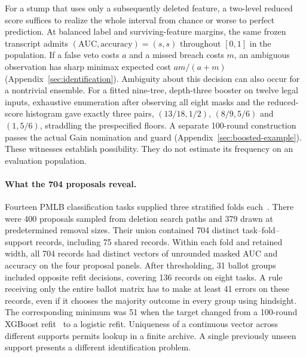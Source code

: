 For a stump that uses only a subsequently deleted feature, a two-level reduced score suffices to realize the whole interval from chance or worse to perfect prediction. At balanced label and surviving-feature margins, the same frozen transcript admits $(\mathrm{AUC},\mathrm{accuracy})=(s,s)$ throughout $[0,1]$ in the population. If a false veto costs $a$ and a missed breach costs $m$, an ambiguous observation has sharp minimax expected cost $am/(a+m)$ (Appendix~\ref{sec:identification}). Ambiguity about this decision can also occur for a nontrivial ensemble. For a fitted nine-tree, depth-three booster on twelve legal inputs, exhaustive enumeration after observing all eight masks and the reduced-score histogram gave exactly three pairs, $(13/18,1/2)$, $(8/9,5/6)$ and $(1,5/6)$, straddling the prespecified floors. A separate 100-round construction passes the actual Gain nomination and guard (Appendix~\ref{sec:boosted-example}). These witnesses establish possibility. They do not estimate its frequency on an evaluation population.

\paragraph{What the 704 proposals reveal.}
Fourteen PMLB classification tasks supplied three stratified folds each~\cite{romano2022pmlb}. There were 400 proposals sampled from deletion search paths and 379 drawn at predetermined removal sizes. Their union contained 704 distinct task--fold--support records, including 75 shared records. Within each fold and retained width, all 704 records had distinct vectors of unrounded masked AUC and accuracy on the four proposal panels. After thresholding, 31 ballot groups included opposite refit decisions, covering 136 records on eight tasks. A rule receiving only the entire ballot matrix has to make at least 41 errors on these records, even if it chooses the majority outcome in every group using hindsight. The corresponding minimum was 51 when the target changed from a 100-round XGBoost refit~\cite{chen2016xgboost} to a logistic refit. Uniqueness of a continuous vector across different supports permits lookup in a finite archive. A single previously unseen support presents a different identification problem.

